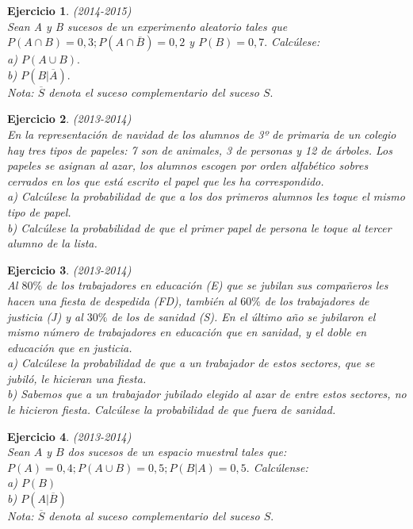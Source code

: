 \documentclass[12pt, a4paper]{amsart}
\newtheorem{ejer}{Ejercicio}
\begin{document}
\begin{ejer}\em (2014-2015)\\
Sean A y B sucesos de un experimento aleatorio tales que $P(A \cap B) = 0, 3; P(A \cap \overline{B}) = 0, 2$ y $P(B) = 0,7.$ Calcúlese:\\
a) $P(A \cup B).$\\
b) $P(B | \overline{A}).$\\
Nota: $\overline{S}$ denota el suceso complementario del suceso $S.$
\end{ejer}

\begin{ejer}\em (2013-2014)\\
En la representación de navidad de los alumnos de 3º de primaria de un colegio hay tres tipos de papeles: 7 son de animales, 3 de personas y 12 de árboles. Los papeles se asignan al azar, los alumnos escogen por orden alfabético sobres cerrados en los que está escrito el papel que les ha correspondido.\\
a) Calcúlese la probabilidad de que a los dos primeros alumnos les toque el mismo tipo de papel.\\
b) Calcúlese la probabilidad de que el primer papel de persona le toque al tercer alumno de la lista.
\end{ejer}

\begin{ejer}\em (2013-2014)\\
Al $80\%$ de los trabajadores en educación (E) que se jubilan sus compañeros les hacen una fiesta de despedida (FD), también al $60\%$ de los trabajadores de justicia (J) y al $30\%$ de los de sanidad (S). En el último año se jubilaron el mismo número de trabajadores en educación que en sanidad, y el doble en educación que en justicia.\\
a) Calcúlese la probabilidad de que a un trabajador de estos sectores, que se jubiló, le hicieran una fiesta.\\
b) Sabemos que a un trabajador jubilado elegido al azar de entre estos sectores, no le hicieron fiesta. Calcúlese la probabilidad de que fuera de sanidad.
\end{ejer}

\begin{ejer}\em (2013-2014)\\
Sean $A$ y $B$ dos sucesos de un espacio muestral tales que: $P(A)=0,4; P(A\cup B)=0,5; P(B|A)=0,5.$ Calcúlense:\\
a) $P(B)$\\
b) $P(A|\overline{B})$\\
\textit{Nota: $\overline{S}$ denota al suceso complementario del suceso $S.$}
\end{ejer}
\end{document}

